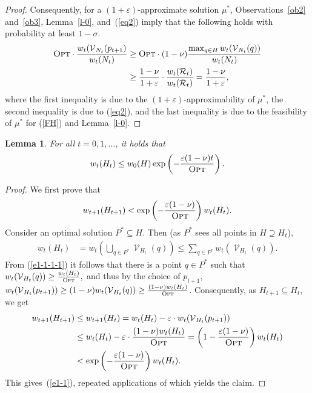 \documentclass[a4paper,11pt]{article}
\newtheorem{lemma}[theorem]{Lemma}
\def\cR{\mathcal R}
\def\cV{\mathcal V}
\def\eps{\varepsilon}
\newcommand{\raf}[1]{(\ref{#1})}
\newcommand{\Vis}{\operatorname{\cV}}
\def \OPT {\textsc{Opt}}
\begin{document}
\begin{proof}
	Consequently, for a $(1+\eps)$-approximate solution $\mu^*$, Observations~\ref{ob2} and~\ref{ob3}, Lemma~\ref{l-0}, and~\raf{eq2} imply that the following holds with probability at least $1-\sigma$.
	\begin{align*}
	\OPT\cdot\frac{w_{t}(\Vis_{N_t}(p_{t+1})}{w_t(N_t)} 
	&\ge\OPT\cdot(1-\nu)\frac{\max_{q\in H}w_t(\Vis_{N_t}(q))}{w_t(N_t)}\\
	&\ge \frac{1-\nu}{1+\eps}  \cdot\frac{w_{t}(\cR_{t})}{w_t(\cR_t)}
	= \frac{1-\nu}{1+\eps},
	\end{align*}
	where the first inequality is due to the $(1+\eps)$-approximability of $\mu^*$, the second inequality is due to (\ref{eq2}), and the last inequality is due to the feasibility of $\mu^*$ for \raf{FH} and Lemma~\ref{l-0}.
\end{proof}
\fi
\begin{lemma} \label{l1} For all $t=0,1,\ldots$, it holds that
	\begin{align}
	w_t(H_t) \leq w_0(H) \exp\left( -\frac{\eps(1-\nu)t}{\OPT}\right).
	\end{align}
\end{lemma}
\begin{proof}
	We first prove that
		\begin{align}\label{e1-1}
	w_{t+1}(H_{t+1})<\exp\left(-\frac{\eps(1-\nu)}{\OPT}\right)w_{t}(H_t).
	\end{align}
	Consider an optimal solution $P^*\subseteq H$. Then (as $P^*$ sees all points in $H\supseteq H_t$), 
	\begin{align}\label{e1-1-1-1}
	w_t(H_t)&=w_t\left(\bigcup_{q\in P^*}\Vis_{H_t}(q)\right)\le \sum_{q\in P^*}w_t(\Vis_{H_t}(q)).
	\end{align}
	From \raf{e1-1-1-1} it follows that there is a point $q\in P^*$ such that  $w_t(\Vis_{H_t}(q))\ge\frac{w_t(H_t)}{\OPT},$ 
	and thus by the choice of $p_{t+1}$, $w_t(\Vis_{H_t}(p_{t+1}))\ge(1-\nu)w_t(\Vis_{H_t}(q))\ge\frac{(1-\nu)w_t(H_t)}{\OPT}$. Consequently, as $H_{t+1}\subseteq H_t$, we get
	\begin{align*}%
	w_{t+1}(H_{t+1})&\le w_{t+1}(H_{t})=w_t(H_t)-\eps \cdot w_t(\Vis_{H_t}(p_{t+1}))\\
	&\le w_t(H_t)-\eps\cdot\frac{(1-\nu)w_t(H_t)}{\OPT}=\left(1-\frac{\eps(1-\nu)}{\OPT}\right)w_t(H_t)\\&<\exp\left(-\frac{\eps(1-\nu)}{\OPT}\right)w_t(H_t).
	\end{align*}
	This gives~\raf{e1-1}, repeated applications of which yields the claim.
\end{proof} 
\end{document}
